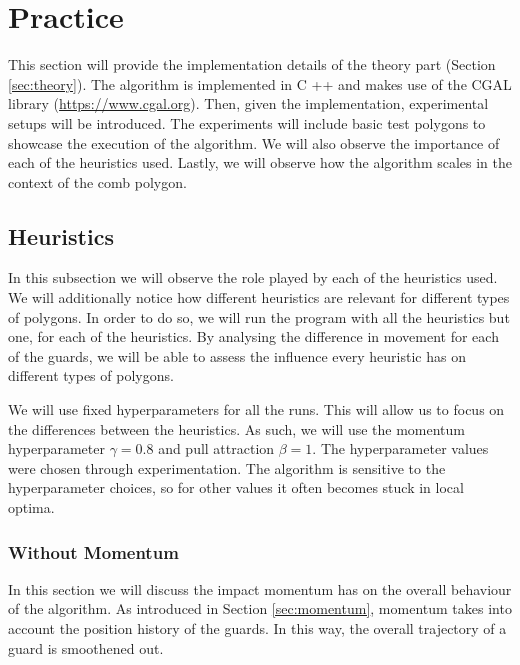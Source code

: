 \section{Practice}
\label{sec:experiments}

This section will provide the implementation details of the theory part (Section \ref{sec:theory}). The algorithm is implemented in C ++ and makes use of the CGAL library (\url{https://www.cgal.org}). 
Then, given the implementation, experimental setups will be introduced. The experiments will include basic test polygons to showcase the execution of the algorithm. We will also observe the importance of each of the heuristics used. Lastly, we will observe how the algorithm scales in the context of the comb polygon.




\subsection{Heuristics}
In this subsection we will observe the role played by each of the heuristics used. We will additionally notice how different heuristics are relevant for different types of polygons. In order to do so, we will run the program with all the heuristics but one, for each of the heuristics. By analysing the difference in movement for each of the guards, we will be able to assess the influence every heuristic has on different types of polygons.

We will use fixed hyperparameters for all the runs. This will allow us to focus on the differences between the heuristics. 
As such, we will use the momentum hyperparameter $\gamma = 0.8$ and pull attraction $\beta = 1$. The hyperparameter values were chosen through experimentation. The algorithm is sensitive to the hyperparameter choices, so for other values it often becomes stuck in local optima.

\subsubsection{Without Momentum}
In this section we will discuss the impact momentum has on the overall behaviour of the algorithm. As introduced in Section \ref{sec:momentum}, momentum takes into account the position history of the guards. In this way, the overall trajectory of a guard is smoothened out.

